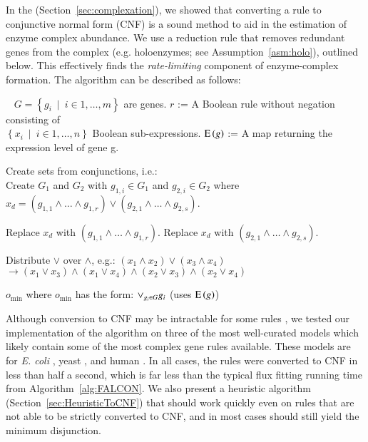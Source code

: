 In the \suppOrApp (Section~\ref{sec:complexation}), we showed that
converting a rule to conjunctive normal form (CNF) is a sound method
to aid in the estimation of enzyme complex abundance. We use a
reduction rule that removes redundant genes from the complex
(e.g. holoenzymes; see \suppOrApp Assumption~\ref{asm:holo}), outlined
below. This effectively finds the \emph{rate-limiting} component of
enzyme-complex formation. The algorithm can be described as follows:

\begin{AlgFloat}[H]
\begin{Algorithm}
\label{alg:ReductionToCNF}
\begin{algorithmic}
~
\INPUT $G = \left\{g_i~\mid~i \in{1, \ldots, m}\right\}$ are genes. 
\INPUT $r$ := A Boolean rule without negation consisting of\\
  $\left\{x_i~\mid~i \in{1, \ldots, n}\right\}$ Boolean sub-expressions.
\INPUT $\operatorname{E}\left(g\right)$ := A map returning the expression level of gene g.
  \State \parbox[t]{\dimexpr\linewidth-\algorithmicindent}{
    Create sets from conjunctions, i.e.:\\
    Create $G_1$ and $G_2$ with $g_{1,i} \in G_1$ 
    and $g_{2,i} \in G_2$ where\\ 
    $x_d = (g_{1,1} \land \ldots \land g_{1,r}) \lor 
    (g_{2,1} \land \ldots \land g_{2,s})$. 
    \strut}
    \State Replace $x_d$ with $(g_{1,1} \land \ldots \land g_{1,r})$.
    \State Replace $x_d$ with $(g_{2,1} \land \ldots \land g_{2,s})$.
    \EndIf 
  \EndIf
  \State \parbox[t]{\dimexpr\linewidth-\algorithmicindent}{
    Distribute $\lor$ over $\land$, e.g.: $(x_1 \land x_2) \lor (x_3 \land x_4)$ \\ 
    $\rightarrow (x_1 \lor x_3) \land (x_1 \lor x_4) \land 
    (x_2 \lor x_3) \land (x_2 \lor x_4)$
    \strut}
\EndWhile
\OUTPUT $o_{\min}$ where $o_{\min}$ has the form: $\lor_{g_i \in G} g_i$ (uses $\operatorname{E}\left(g\right)$)
\end{algorithmic} 
\end{Algorithm}
\end{AlgFloat}

Although conversion to CNF may be intractable for some rules
\citep{Russell2009}, we tested our implementation of the algorithm on
three of the most well-curated models which likely contain some of the
most complex gene rules available. These models are for \textit{E. coli}
\citep{Orth2011a}, yeast \citep{Aung2013}, and human
\citep{Thiele2013}. In all cases, the rules were converted to CNF in
less than half a second, which is far less than the typical flux
fitting running time from Algorithm~\ref{alg:FALCON}. We also present
a heuristic algorithm (Section~\ref{sec:HeuristicToCNF}) that should
work quickly even on rules that are not able to be strictly converted
to CNF, and in most cases should still yield the minimum disjunction.

